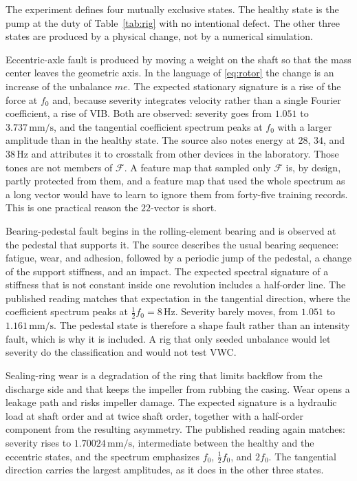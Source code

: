 The experiment defines four mutually exclusive states.
The healthy state is the pump at the duty of Table~\ref{tab:rig} with no intentional defect.
The other three states are produced by a physical change, not by a numerical simulation.

Eccentric-axle fault is produced by moving a weight on the shaft so that the mass center leaves the geometric axis.
In the language of \eqref{eq:rotor} the change is an increase of the unbalance \(m e\).
The expected stationary signature is a rise of the force at \(f_{0}\) and, because severity integrates velocity rather than a single Fourier coefficient, a rise of VIB.
Both are observed: severity goes from \(1.051\) to \(3.737\,\mathrm{mm/s}\), and the tangential coefficient spectrum peaks at \(f_{0}\) with a larger amplitude than in the healthy state.
The source also notes energy at \(28\), \(34\), and \(38\,\mathrm{Hz}\) and attributes it to crosstalk from other devices in the laboratory.
Those tones are not members of \(\mathcal{F}\).
A feature map that sampled only \(\mathcal{F}\) is, by design, partly protected from them, and a feature map that used the whole spectrum as a long vector would have to learn to ignore them from forty-five training records.
This is one practical reason the \(22\)-vector is short.

Bearing-pedestal fault begins in the rolling-element bearing and is observed at the pedestal that supports it.
The source describes the usual bearing sequence: fatigue, wear, and adhesion, followed by a periodic jump of the pedestal, a change of the support stiffness, and an impact.
The expected spectral signature of a stiffness that is not constant inside one revolution includes a half-order line.
The published reading matches that expectation in the tangential direction, where the coefficient spectrum peaks at \(\tfrac12 f_{0}=8\,\mathrm{Hz}\).
Severity barely moves, from \(1.051\) to \(1.161\,\mathrm{mm/s}\).
The pedestal state is therefore a shape fault rather than an intensity fault, which is why it is included.
A rig that only seeded unbalance would let severity do the classification and would not test VWC.

Sealing-ring wear is a degradation of the ring that limits backflow from the discharge side and that keeps the impeller from rubbing the casing.
Wear opens a leakage path and risks impeller damage.
The expected signature is a hydraulic load at shaft order and at twice shaft order, together with a half-order component from the resulting asymmetry.
The published reading again matches: severity rises to \(1.70024\,\mathrm{mm/s}\), intermediate between the healthy and the eccentric states, and the spectrum emphasizes \(f_{0}\), \(\tfrac12 f_{0}\), and \(2f_{0}\).
The tangential direction carries the largest amplitudes, as it does in the other three states.

